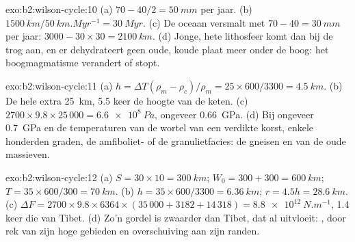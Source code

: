 \begin{solution}{exo:b2:wilson-cycle:10}
(a) $70 - 40/2 = \qty{50}{mm}$ per jaar. (b) $\qty{1500}{km}/\qty{50}{km.Myr^{-1}} =
\qty{30}{Myr}$. (c) De oceaan versmalt met $70 - 40 = \qty{30}{mm}$ per jaar: $3000 - 30\times30 =
\qty{2100}{km}$. (d) Jonge, hete lithosfeer komt dan bij de trog aan, en er dehydrateert geen oude, koude plaat
meer onder de boog: het boogmagmatisme verandert of stopt.
\end{solution}

\begin{solution}{exo:b2:wilson-cycle:11}
(a) $h = \Delta T(\rho_m - \rho_c)/\rho_m = 25\times600/3300 = \qty{4.5}{km}$. (b) De hele extra
\qty{25}{km}, 5.5 keer de hoogte van de keten. (c) $2700\times9.8\times25\,000 =
\qty{6.6e8}{Pa}$, ongeveer \qty{0.66}{GPa}. (d) Bij ongeveer \qty{0.7}{GPa} en de temperaturen van
de wortel van een verdikte korst, enkele honderden graden, de amfiboliet- of de granulietfacies:
de gneisen en  van de oude massieven.
\end{solution}

\begin{solution}{exo:b2:wilson-cycle:12}
(a) $S = 30\times10 = \qty{300}{km}$; $W_0 = 300 + 300 = \qty{600}{km}$; $T = 35\times600/300 =
\qty{70}{km}$. (b) $h = 35\times600/3300 = \qty{6.36}{km}$; $r = 4.5h = \qty{28.6}{km}$.
(c) $\Delta F = 2700\times9.8\times6364\times(35\,000 + 3182 + 14\,318) =
\qty{8.8e12}{N.m^{-1}}$, 1.4 keer die van Tibet. (d) Zo'n gordel is zwaarder dan Tibet, dat al
uitvloeit: , door rek van zijn hoge gebieden en overschuiving aan zijn randen.
\end{solution}

